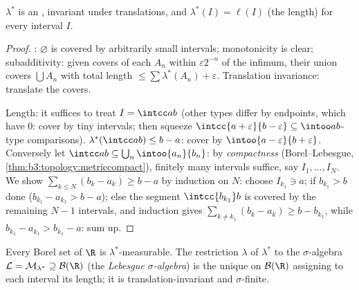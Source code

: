 \begin{lemma}\label{lem:b3:measure:outerbasics}
$\lambda^*$ is an , invariant under translations,
and $\lambda^*(I) = \ell(I)$ (the length) for every interval
$I$.
\end{lemma}

\begin{proof}
: $\varnothing$ is covered by arbitrarily small
intervals; monotonicity is clear; subadditivity: given covers
of each $A_n$ within $\varepsilon 2^{-n}$ of the infimum,
their union covers $\bigcup A_n$ with total length $\leq \sum
\lambda^*(A_n) + \varepsilon$. Translation invariance:
translate the covers.

Length: it suffices to treat $I = \intcc ab$ (other types
differ by endpoints, which have  $0$: cover by
tiny intervals; then squeeze $\intcc{a+\varepsilon}{b -
\varepsilon} \subseteq \intoo ab$-type comparisons).
$\lambda^*(\intcc ab) \leq b - a$: cover by
$\intoo{a-\varepsilon}{b+\varepsilon}$. Conversely let $\intcc
ab \subseteq \bigcup_n\intoo{a_n}{b_n}$: by
\emph{compactness} (Borel--Lebesgue,
\cref{thm:b3:topology:metriccompact}), finitely many intervals
suffice, say $I_1, \dots, I_N$. We show $\sum_{k\leq N}(b_k -
a_k) \geq b - a$ by induction on $N$: choose $I_{k_1} \ni a$; if
$b_{k_1} > b$ done ($b_{k_1} - a_{k_1} > b - a$); else the
segment $\intcc{b_{k_1}}b$ is covered by the remaining $N - 1$
intervals, and induction gives $\sum_{k \neq k_1}(b_k - a_k)
\geq b - b_{k_1}$, while $b_{k_1} - a_{k_1} > b_{k_1} - a$:
sum up.
\end{proof}

\begin{theorem}\label{thm:b3:measure:lebesgue}
Every Borel set of $\R$ is $\lambda^*$-measurable. The
restriction $\lambda$ of $\lambda^*$ to the $\sigma$-algebra
$\mathcal L = \mathcal M_{\lambda^*} \supseteq \mathcal B(\R)$
(the \emph{Lebesgue $\sigma$-algebra}) is the unique  on
$\mathcal B(\R)$ assigning to each interval its length; it is
translation-invariant and $\sigma$-finite.
\end{theorem}


